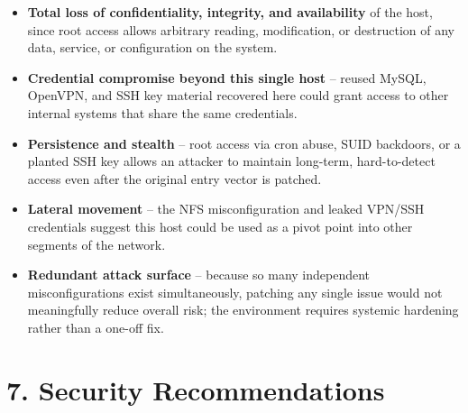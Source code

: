\documentclass[11pt]{article}
\begin{document}
\begin{itemize}
  \item \textbf{Total loss of confidentiality, integrity, and availability} of the host, since
        root access allows arbitrary reading, modification, or destruction of any data, service,
        or configuration on the system.
  \item \textbf{Credential compromise beyond this single host} -- reused MySQL, OpenVPN, and SSH
        key material recovered here could grant access to other internal systems that share the
        same credentials.
  \item \textbf{Persistence and stealth} -- root access via cron abuse, SUID backdoors, or a
        planted SSH key allows an attacker to maintain long-term, hard-to-detect access even after
        the original entry vector is patched.
  \item \textbf{Lateral movement} -- the NFS misconfiguration and leaked VPN/SSH credentials
        suggest this host could be used as a pivot point into other segments of the network.
  \item \textbf{Redundant attack surface} -- because so many independent misconfigurations exist
        simultaneously, patching any single issue would not meaningfully reduce overall risk; the
        environment requires systemic hardening rather than a one-off fix.
\end{itemize}

\section{7. Security Recommendations}
\end{document}
